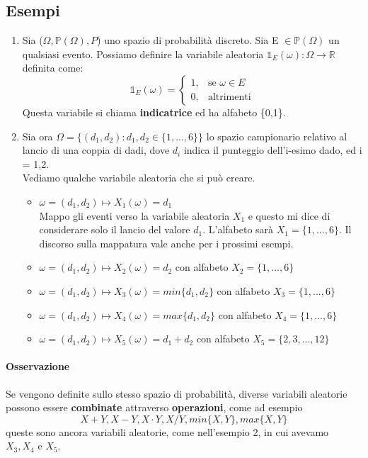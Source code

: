 \documentclass{report}
\newcommand{\Pn}{\mathbb{P}}
\begin{document}
\subsection{Esempi}\begin{enumerate}
    \item Sia (\(\Omega,\Pn(\Omega), P\)) uno spazio di probabilità discreto. Sia E \(\in \Pn(\Omega)\) un qualsiasi evento. Possiamo definire la variabile aleatoria \(\mathds{1}_E (\omega): \Omega \xrightarrow{} \mathbb{R}\) definita come: \[
    \mathds{1}_E (\omega) = \begin{cases}
    1, & \text{se }\omega \in E\\
    0, & \text{altrimenti}
    \end{cases}
    \]
    Questa variabile si chiama \textbf{indicatrice} ed ha alfabeto \{0,1\}.
    \item Sia ora \(\Omega = \{(d_1,d_2): d_1,d_2 \in \{1,...,6\}\}\) lo spazio campionario relativo al lancio di una coppia di dadi, dove \(d_i\) indica il punteggio dell'i-esimo dado, ed i = 1,2.\\
    Vediamo qualche variabile aleatoria che si può creare.
    \begin{itemize}
        \item \(\omega = (d_1,d_2) \longmapsto X_1(\omega) = d_1\) \\ 
        Mappo gli eventi verso la variabile aleatoria \(X_1\) e questo mi dice di considerare solo il lancio del valore \(d_1\). L'alfabeto sarà \(X_1 = \{1,...,6\}\). Il discorso sulla mappatura vale anche per i prossimi esempi.
        \item \(\omega = (d_1,d_2) \longmapsto X_2(\omega) = d_2\) con alfabeto \(X_2 = \{1,...,6\}\)
        \item \(\omega = (d_1,d_2) \longmapsto X_3(\omega) = min \{d_1,d_2\}\) con alfabeto \(X_3 = \{1,...,6\}\)
        \item \(\omega = (d_1,d_2) \longmapsto X_4(\omega) = max \{d_1,d_2\}\) con alfabeto \(X_4 = \{1,...,6\}\)
        \item \(\omega = (d_1,d_2) \longmapsto X_5(\omega) = d_1 + d_2\) con alfabeto \(X_5 = \{2,3,...,12\}\)
    \end{itemize}
\end{enumerate}
\paragraph{Osservazione} Se vengono definite sullo stesso spazio di probabilità, diverse variabili aleatorie possono essere \textbf{combinate} attraverso \textbf{operazioni}, come ad esempio \[X+Y, X-Y, X\cdot Y, X/Y, min \{X,Y\}, max \{X, Y\}\] queste sono ancora variabili aleatorie, come nell'esempio 2, in cui avevamo \(X_3, X_4 \text{ e }X_5\).
\end{document}
